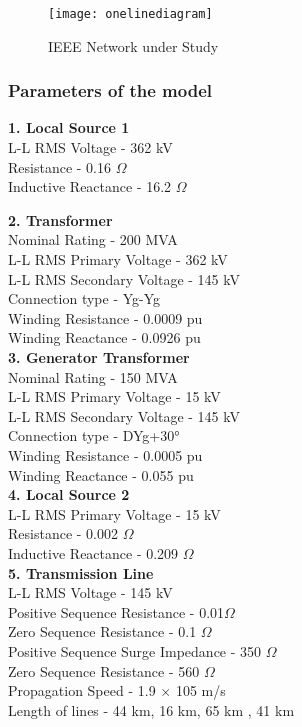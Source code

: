 \begin{figure}[!htbp]
    \centering
    \texttt{[image: onelinediagram]}
    \caption[IEEE Network under Study]{IEEE Network under Study \cite{ApplicationofTransientRecovery}}
    \label{fig:IEEE Network under Study }
\end{figure}

\subsubsection*{Parameters of the model}

\textbf{1. Local Source 1}\\
L-L RMS Voltage - 362 kV\\
Resistance - 0.16 $\Omega$\\
Inductive Reactance - 16.2 $\Omega$\\
\clearpage

\textbf{2. Transformer}\\
Nominal Rating - 200 MVA\\
L-L RMS Primary Voltage - 362 kV \\
L-L RMS Secondary Voltage - 145 kV\\
Connection type - Yg-Yg\\
Winding Resistance - 0.0009 pu\\
Winding Reactance - 0.0926 pu\\

\textbf{3. Generator Transformer}\\
Nominal Rating - 150 MVA\\
L-L RMS Primary Voltage - 15 kV \\
L-L RMS Secondary Voltage - 145 kV\\
Connection type - DYg+\ang{30}\\
Winding Resistance - 0.0005 pu\\
Winding Reactance - 0.055 pu\\

\textbf{4. Local Source 2}\\
L-L RMS Primary Voltage - 15 kV\\
Resistance - 0.002 $\Omega$\\
Inductive Reactance - 0.209 $\Omega$\\

\textbf{5. Transmission Line}\\
L-L RMS Voltage - 145 kV\\
Positive Sequence Resistance - 0.01$\Omega$\\
Zero Sequence Resistance - 0.1 $\Omega$\\
Positive Sequence Surge Impedance - 350 $\Omega$\\
Zero Sequence Resistance - 560 $\Omega$\\
Propagation Speed - 1.9 $\times$ 105 m/s\\
Length of lines - 44 km, 16 km, 65 km , 41 km\\

